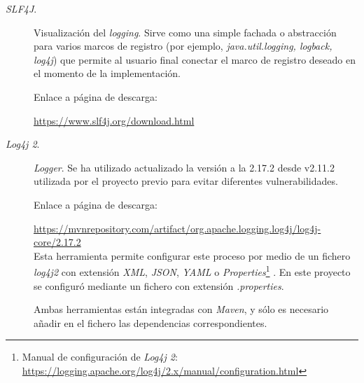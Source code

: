 \begin{description}
	\item[\textit{SLF4J}.] Visualización del \textit{logging}.
	Sirve como una simple fachada o abstracción para varios marcos de registro (por ejemplo, \textit{java.util.logging, logback, log4j}) que permite al usuario final conectar el marco de registro deseado en el momento de la implementación.
	
		Enlace a página de descarga:
	
		\url{https://www.slf4j.org/download.html}
	
	\item[\textit{Log4j 2}.] \textit{Logger}. Se ha utilizado actualizado la versión a la 2.17.2 desde v2.11.2 utilizada por el proyecto previo \cite{TFGPrevio} para evitar diferentes vulnerabilidades.

	 	Enlace a página de descarga:
	
	 	\url{https://mvnrepository.com/artifact/org.apache.logging.log4j/log4j-core/2.17.2}\\
		
		Esta herramienta permite configurar este proceso por medio de un fichero \textit{log4j2} con extensión \textit{XML}, \textit{JSON}, \textit{YAML} o \textit{Properties}\footnote{Manual de configuración de \textit{Log4j 2}: \url{https://logging.apache.org/log4j/2.x/manual/configuration.html}} \cite{apache_apache_nodate}. En este proyecto se configuró mediante un fichero con extensión \textit{.properties}. 
		
		Ambas herramientas están integradas con \textit{Maven}, y sólo es necesario añadir en el fichero  las dependencias correspondientes.
	
\end{description}
